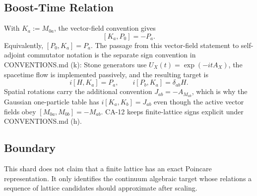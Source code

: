 \subsection{Boost-Time Relation}

With \(K_a:=M_{0a}\), the vector-field convention gives
\[
  [K_a,P_0]=-P_a.
\]
Equivalently, \([P_0,K_a]=P_a\).  The passage from this vector-field statement to
self-adjoint commutator notation is the separate sign convention in
CONVENTIONS.md (k): Stone generators use \(U_X(t)=\exp(-itA_X)\), the spacetime
flow is implemented passively, and the resulting target is
\[
  i[H,K_a]=P_a,\qquad i[P_b,K_a]=\delta_{ab}H.
\]
Spatial rotations carry the additional convention \(J_{ab}=-A_{M_{ab}}\), which
is why the Gaussian one-particle table has \(i[K_a,K_b]=J_{ab}\) even though the
active vector fields obey \([M_{0a},M_{0b}]=-M_{ab}\).  CA-12 keeps finite-lattice
signs explicit under CONVENTIONS.md (h).

\subsection{Boundary}

This shard does not claim that a finite lattice has an exact Poincare
representation.  It only identifies the continuum algebraic target whose
relations a sequence of lattice candidates should approximate after scaling.
